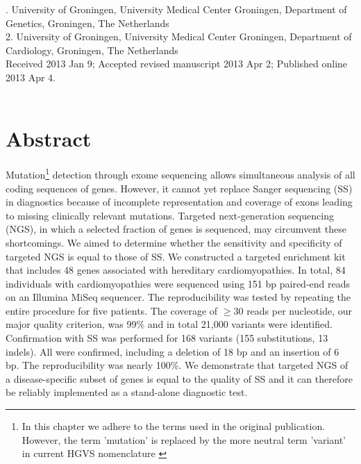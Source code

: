 . University of Groningen, University Medical Center Groningen, Department of Genetics, Groningen, The Netherlands\\
2. University of Groningen, University Medical Center Groningen, Department of Cardiology, Groningen, The Netherlands\\


\noindent
Received 2013 Jan 9; Accepted revised manuscript 2013 Apr 2; Published online 2013 Apr 4.
\\~\\


\section*{Abstract}\label{abstract}
Mutation\footnote{In this chapter we adhere to the terms used in the original publication. However, the term 'mutation' is replaced by the more neutral term 'variant' in current HGVS nomenclature \cite{den_Dunnen_2016}} detection through exome sequencing allows simultaneous analysis of all coding sequences of genes. 
However, it cannot yet replace Sanger sequencing (SS) in diagnostics because of incomplete representation and coverage of exons leading to missing clinically relevant mutations. 
Targeted next-generation sequencing (NGS), in which a selected fraction of genes is sequenced, may circumvent these shortcomings. 
We aimed to determine whether the sensitivity and specificity of targeted NGS is equal to those of SS. 
We constructed a targeted enrichment kit that includes 48 genes associated with hereditary cardiomyopathies. 
In total, 84 individuals with cardiomyopathies were sequenced using 151 bp paired-end reads on an Illumina MiSeq sequencer. 
The reproducibility was tested by repeating the entire procedure for five patients. 
The coverage of $\geq$30 reads per nucleotide, our major quality criterion, was 99\% and in total {\textapprox}21,000 variants were identified. 
Confirmation with SS was performed for 168 variants (155 substitutions, 13 indels). 
All were confirmed, including a deletion of 18 bp and an insertion of 6 bp. 
The reproducibility was nearly 100\%. 
We demonstrate that targeted NGS of a disease-specific subset of genes is equal to the quality of SS and it can therefore be reliably implemented as a stand-alone diagnostic test.

